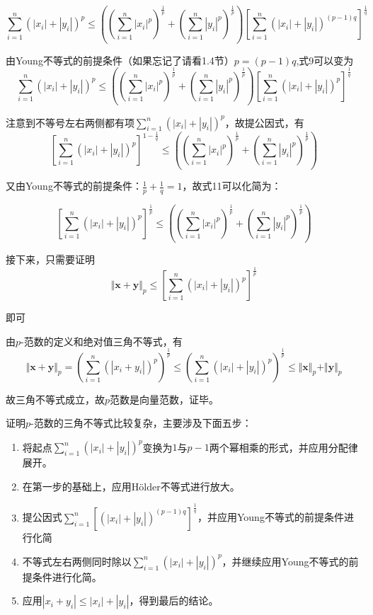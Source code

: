\documentclass[12pt, a4paper, oneside, UTF8]{ctexbook}
\begin{document}
\[
\sum\limits_{i=1}^n\left(|x_i|+|y_i|\right)^p\leq\left(\left(\sum\limits_{i=1}^n|x_i|^p\right)^{\frac{1}{p}}+\left(\sum\limits_{i=1}^n|y_i|^p\right)^{\frac{1}{p}}\right)\left[\sum\limits_{i=1}^n(|x_i|+|y_i|)^{(p-1)q}\right]^{\frac{1}{q}}\tag{9}
\]

由Young不等式的前提条件（如果忘记了请看1.4节）$p=(p-1)q$,式9可以变为
\[
\sum\limits_{i=1}^n\left(|x_i|+|y_i|\right)^p\leq\left(\left(\sum\limits_{i=1}^n|x_i|^p\right)^{\frac{1}{p}}+\left(\sum\limits_{i=1}^n|y_i|^p\right)^{\frac{1}{p}}\right)\left[\sum\limits_{i=1}^n(|x_i|+|y_i|)^{p}\right]^{\frac{1}{q}}\tag{10}
\]

注意到不等号左右两侧都有项$\sum\limits_{i=1}^n\left(|x_i|+|y_i|\right)^p$，故提公因式，有
\[
\left[\sum\limits_{i=1}^n\left(|x_i|+|y_i|\right)^p\right]^{1-\frac{1}{q}}\leq\left(\left(\sum\limits_{i=1}^n|x_i|^p\right)^{\frac{1}{p}}+\left(\sum\limits_{i=1}^n|y_i|^p\right)^{\frac{1}{p}}\right)\tag{11}
\]

又由Young不等式的前提条件：$\frac{1}{p}+\frac{1}{q}=1$，故式11可以化简为：

\[
\left[\sum\limits_{i=1}^n\left(|x_i|+|y_i|\right)^p\right]^{\frac{1}{p}}\leq\left(\left(\sum\limits_{i=1}^n|x_i|^p\right)^{\frac{1}{p}}+\left(\sum\limits_{i=1}^n|y_i|^p\right)^{\frac{1}{p}}\right)\tag{12}
\]

接下来，只需要证明
\[
\Vert\boldsymbol{x+y}\Vert_p\leq\left[\sum\limits_{i=1}^n\left(|x_i|+|y_i|\right)^p\right]^{\frac{1}{p}}
\]

即可

由$p$-范数的定义和绝对值三角不等式，有
\[
\Vert\boldsymbol{x+y}\Vert_p=\left(\sum\limits_{i=1}^n
(|x_i+y_i|)^p\right)^{\frac{1}{p}}\leq\left(\sum\limits_{i=1}^n
(|x_i|+|y_i|)^p\right)^{\frac{1}{p}}\leq\Vert\boldsymbol{x}\Vert_p+\Vert\boldsymbol{y}\Vert_p
\]

故三角不等式成立，故$p$范数是向量范数，证毕。

证明$p$-范数的三角不等式比较复杂，主要涉及下面五步：
\begin{enumerate}[leftmargin=4em]
    \item 将起点$\sum\limits_{i=1}^n(|x_i|+|y_i|)^p$变换为$1$与$p-1$两个幂相乘的形式，并应用分配律展开。
    \item 在第一步的基础上，应用Hölder不等式进行放大。
    \item 提公因式$\sum\limits_{i=1}^n\left[(|x_i|+|y_i|)^{(p-1)q}\right]^{\frac{1}{q}}$，并应用Young不等式的前提条件进行化简
    \item 不等式左右两侧同时除以$\sum\limits_{i=1}^n\left(|x_i|+|y_i|\right)^p$，并继续应用Young不等式的前提条件进行化简。
    \item 应用$|x_i+y_i|\leq |x_i|+|y_i|$，得到最后的结论。
\end{enumerate}
\end{document}
